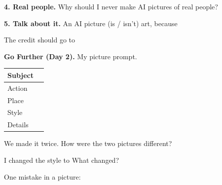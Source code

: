 \documentclass[11pt]{article}
\begin{document}
\newpage

{\large\textbf{4. Real people.}} Why should I never make AI pictures of real people? 

\vspace{0.5em}

\vspace{1.0em}
{\large\textbf{5. Talk about it.}} An AI picture (is / isn't) art, because 

\vspace{0.6em}
The credit should go to 

\vspace{1.3em}
{\large\textbf{Go Further (Day 2).}} My picture prompt.

\vspace{0.3em}
\begin{tabular}{|R{1.0in}|R{5.5in}|}
\hline
Subject &  \\[0.4em] \hline
Action &  \\[0.4em] \hline
Place &  \\[0.4em] \hline
Style &  \\[0.4em] \hline
Details &  \\[0.4em] \hline
\end{tabular}

\vspace{0.8em}
We made it twice. How were the two pictures different? 

\vspace{0.7em}
I changed the style to  What changed? \ansline{2.6in}{}

\vspace{0.7em}
One mistake in a picture: 
\end{document}
